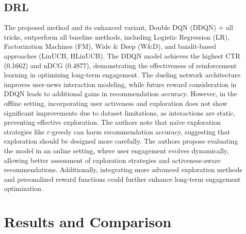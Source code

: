 \documentclass{ieeetj}
\begin{document}

\subsection{DRL\cite{zheng_drn_2018}}
The proposed method and its enhanced variant, Double DQN (DDQN) + all tricks, outperform all baseline methods, including Logistic Regression (LR), Factorization Machines (FM), Wide \& Deep (W\&D), and bandit-based approaches (LinUCB, HLinUCB). The DDQN model achieves the highest CTR (0.1662) and nDCG (0.4877), demonstrating the effectiveness of reinforcement learning in optimizing long-term engagement. The dueling network architecture improves user-news interaction modeling, while future reward consideration in DDQN leads to additional gains in recommendation accuracy. However, in the offline setting, incorporating user activeness and exploration does not show significant improvements due to dataset limitations, as interactions are static, preventing effective exploration. The authors note that na\"{i}ve exploration strategies like $\varepsilon$-greedy can harm recommendation accuracy, suggesting that exploration should be designed more carefully. The authors propose evaluating the model in an online setting, where user engagement evolves dynamically, allowing better assessment of exploration strategies and activeness-aware recommendations. Additionally, integrating more advanced exploration methods and personalized reward functions could further enhance long-term engagement optimization.

\section{Results and Comparison}
\end{document}
